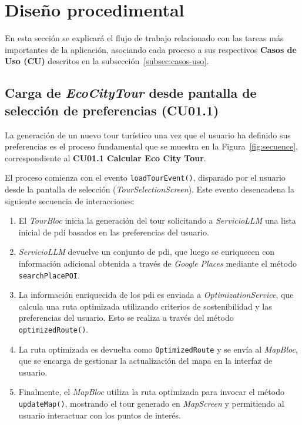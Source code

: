 \section{Diseño procedimental}
En esta sección se explicará el flujo de trabajo relacionado con las tareas más importantes de la aplicación, asociando cada proceso a sus respectivos \textbf{Casos de Uso (CU)} descritos en la subsección~\ref{subsec:casos-uso}.

\subsection{Carga de \textit{EcoCityTour} desde pantalla de selección de preferencias (CU01.1)}
La generación de un nuevo tour turístico una vez que el usuario ha definido sus preferencias es el proceso fundamental que se muestra en la Figura~\ref{fig:secuence}, correspondiente al \textbf{CU01.1 Calcular Eco City Tour}.

El proceso comienza con el evento \texttt{loadTourEvent()}, disparado por el usuario desde la pantalla de selección (\textit{TourSelectionScreen}). Este evento desencadena la siguiente secuencia de interacciones:
\begin{enumerate}
	\item El \textit{TourBloc} inicia la generación del tour solicitando a \textit{ServicioLLM} una lista inicial de \acrlong{pdi} basados en las preferencias del usuario.
	\item \textit{ServicioLLM} devuelve un conjunto de \acrlong{pdi}, que luego se enriquecen con información adicional obtenida a través de \textit{Google Places} mediante el método \texttt{searchPlacePOI}.
	\item La información enriquecida de los \acrlong{pdi} es enviada a \textit{OptimizationService}, que calcula una ruta optimizada utilizando criterios de sostenibilidad y las preferencias del usuario. Esto se realiza a través del método \texttt{optimizedRoute()}.
	\item La ruta optimizada es devuelta como \texttt{OptimizedRoute} y se envía al \textit{MapBloc}, que se encarga de gestionar la actualización del mapa en la interfaz de usuario.
	\item Finalmente, el \textit{MapBloc} utiliza la ruta optimizada para invocar el método \texttt{updateMap()}, mostrando el tour generado en \textit{MapScreen} y permitiendo al usuario interactuar con los puntos de interés.
\end{enumerate}

